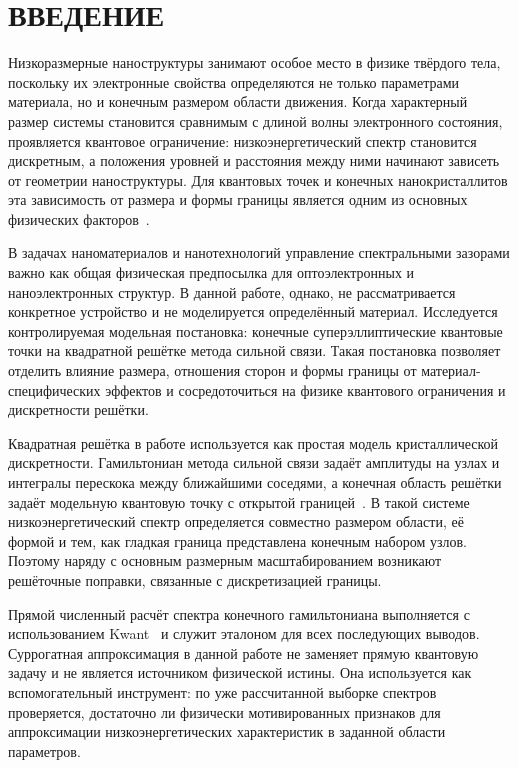 \chapter*{ВВЕДЕНИЕ}

Низкоразмерные наноструктуры занимают особое место в физике твёрдого тела, поскольку их
электронные свойства определяются не только параметрами материала, но и конечным размером
области движения. Когда характерный размер системы становится сравнимым с длиной волны
электронного состояния, проявляется квантовое ограничение: низкоэнергетический спектр
становится дискретным, а положения уровней и расстояния между ними начинают зависеть от
геометрии наноструктуры. Для квантовых точек и конечных нанокристаллитов эта зависимость
от размера и формы границы является одним из основных физических
факторов~\cite{jacak1998quantumdots,reimann2002quantumdots}.

В задачах наноматериалов и нанотехнологий управление спектральными зазорами важно как
общая физическая предпосылка для оптоэлектронных и наноэлектронных структур. В данной
работе, однако, не рассматривается конкретное устройство и не моделируется определённый
материал. Исследуется контролируемая модельная постановка: конечные суперэллиптические
квантовые точки на квадратной решётке метода сильной связи. Такая постановка позволяет
отделить влияние размера, отношения сторон и формы границы от материал-специфических
эффектов и сосредоточиться на физике квантового ограничения и дискретности решётки.

Квадратная решётка в работе используется как простая модель кристаллической дискретности.
Гамильтониан метода сильной связи задаёт амплитуды на узлах и интегралы перескока между
ближайшими соседями, а конечная область решётки задаёт модельную квантовую точку с
открытой границей~\cite{slater1954lcao,kittel2005solidstate}. В такой системе
низкоэнергетический спектр определяется совместно размером области, её формой и тем, как
гладкая граница представлена конечным набором узлов. Поэтому наряду с основным размерным
масштабированием возникают решёточные поправки, связанные с дискретизацией границы.

Прямой численный расчёт спектра конечного гамильтониана выполняется с использованием
Kwant~\cite{groth2014kwant} и служит эталоном для всех последующих выводов. Суррогатная
аппроксимация в данной работе не заменяет прямую квантовую задачу и не является источником
физической истины. Она используется как вспомогательный инструмент: по уже рассчитанной
выборке спектров проверяется, достаточно ли физически мотивированных признаков для
аппроксимации низкоэнергетических характеристик в заданной области параметров.


